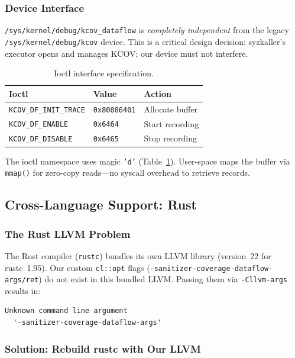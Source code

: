 \documentclass{ndss}
\begin{document}
\subsubsection{Device Interface}

\texttt{/sys/kernel/debug/kcov\_dataflow} is \emph{completely independent} from
the legacy \texttt{/sys/kernel/debug/kcov} device. This is a critical design
decision: syzkaller's executor opens and manages KCOV; our device must not
interfere.

\begin{table}[t]
\centering
\caption{Ioctl interface specification.}\label{tab:ioctl}
\small
\begin{tabular}{@{}lll@{}}
\toprule
\textbf{Ioctl} & \textbf{Value} & \textbf{Action} \\
\midrule
\texttt{KCOV\_DF\_INIT\_TRACE} & \texttt{0x80086401} & Allocate buffer \\
\texttt{KCOV\_DF\_ENABLE} & \texttt{0x6464} & Start recording \\
\texttt{KCOV\_DF\_DISABLE} & \texttt{0x6465} & Stop recording \\
\bottomrule
\end{tabular}
\end{table}

The ioctl namespace uses magic \texttt{'d'} (Table~\ref{tab:ioctl}). User-space
maps the buffer via \texttt{mmap()} for zero-copy reads---no syscall overhead
to retrieve records.

\subsection{Cross-Language Support: Rust}\label{sec:rust}

\subsubsection{The Rust LLVM Problem}

The Rust compiler (\texttt{rustc}) bundles its own LLVM library (version~22 for
rustc~1.95). Our custom \texttt{cl::opt} flags
(\texttt{-sanitizer-coverage-dataflow-args/ret}) do not exist in this bundled
LLVM. Passing them via \texttt{-Cllvm-args} results in:
\begin{lstlisting}[numbers=none]
Unknown command line argument
  '-sanitizer-coverage-dataflow-args'
\end{lstlisting}

\subsubsection{Solution: Rebuild rustc with Our LLVM}
\end{document}
